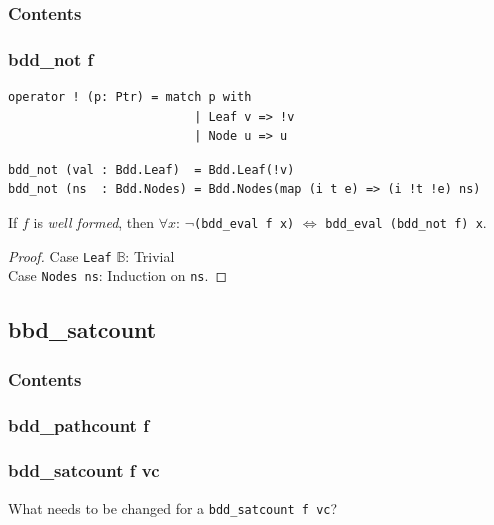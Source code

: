\documentclass[english, aspectratio=169]{beamer}
\newcommand{\B}[0]{\ensuremath{\mathbb{B}}}
\begin{document}
\begin{frame}{}
  \frametitle{Contents}
\end{frame}

\begin{frame}[fragile]
  \frametitle{bdd\_not f}

  \begin{lstlisting}
operator ! (p: Ptr) = match p with
                          | Leaf v => !v
                          | Node u => u
  \end{lstlisting}
  \begin{lstlisting}[firstnumber=4]
bdd_not (val : Bdd.Leaf)  = Bdd.Leaf(!v)
bdd_not (ns  : Bdd.Nodes) = Bdd.Nodes(map (i t e) => (i !t !e) ns)
  \end{lstlisting}

  \pause

  \begin{theorem}
    If $f$ is \emph{well formed}, then $\forall x$: $\neg$\texttt{(bdd\_eval f x)} $\iff$
    \texttt{bdd\_eval (bdd\_not f) x}.
  \end{theorem}
  \begin{proof}
    Case \texttt{Leaf} $\B$: Trivial\\
    Case \texttt{Nodes ns}: Induction on \texttt{ns}.
  \end{proof}
\end{frame}

\subsection{bbd\_satcount}

\begin{frame}{}
  \frametitle{Contents}
\end{frame}

\begin{frame}
  \frametitle{bdd\_pathcount f}

  
\end{frame}

\begin{frame}{}
  \frametitle{bdd\_satcount f vc}

  \begin{center}
    \Huge

    What needs to be changed for a \texttt{bdd\_satcount f vc}?
  \end{center}
\end{frame}
\end{document}
